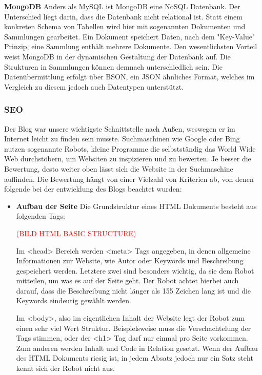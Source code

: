 {    \textbf{MongoDB}
    Anders als MySQL ist {MongoDB\cite{mongodb}} eine NoSQL Datenbank. Der Unterschied liegt darin, dass die Datenbank nicht relational ist. Statt einem konkreten Schema von Tabellen
    wird hier mit sogenannten Dokumenten und Sammlungen gearbeitet. Ein Dokument speichert Daten, nach dem "Key-Value" Prinzip, eine Sammlung enthält mehrere Dokumente.
    Den wesentlichsten Vorteil weist MongoDB in der dynamischen Gestaltung der Datenbank auf. Die Strukturen in Sammlungen können demnach unterschiedlich sein. Die
    Datenübermittlung erfolgt über {BSON\cite{bson}}, ein JSON ähnliches Format, welches im Vergleich zu diesem jedoch auch Datentypen unterstützt.

    \subsubsection{SEO}
    Der Blog war unsere wichtigste Schnittstelle nach Außen, weswegen er im Internet leicht zu finden sein musste. Suchmaschinen wie Google oder Bing nutzen
    sogenannte Robots, kleine Programme die selbstständig das World Wide Web durchstöbern, um Websiten zu inspizieren und zu bewerten. Je besser die Bewertung,
    desto weiter oben lässt sich die Website in der Suchmaschine auffinden.
    Die Bewertung hängt von einer Vielzahl von Kriterien ab, von denen folgende bei der entwicklung des Blogs beachtet wurden:

    \begin{itemize}
      \item \textbf{Aufbau der Seite}
        Die Grundstruktur eines HTML Dokuments besteht aus folgenden Tags:

        \textcolor{red}{(BILD HTML BASIC STRUCTURE)}

        Im <head> Bereich werden <meta> Tags angegeben, in denen allgemeine Informationen zur Website, wie Autor oder Keywords und Beschreibung gespeichert werden.
        Letztere zwei sind besonders wichtig, da sie dem Robot mitteilen, um was es auf der Seite geht. Der Robot achtet hierbei auch darauf, dass die Beschreibung nicht
        länger als 155 Zeichen lang ist und die Keywords eindeutig gewählt werden.

        Im <body>, also im eigentlichen Inhalt der Website legt der Robot zum einen sehr viel Wert Struktur. Beispielsweise muss die Verschachtelung der Tags stimmen, oder der <h1> Tag darf nur einmal pro Seite
        vorkommen. Zum anderen werden Inhalt und Code in Relation gesetzt. Wenn der Aufbau des HTML Dokuments riesig ist, in jedem Absatz jedoch nur ein Satz steht kennt sich der Robot nicht aus.


\end{itemize}}

